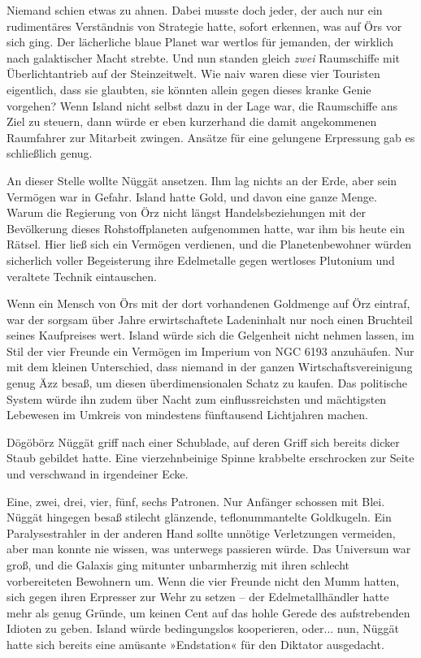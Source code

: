 Niemand schien etwas zu ahnen. Dabei musste doch jeder, der auch nur ein rudimentäres Verständnis von Strategie hatte, sofort erkennen, was auf Örs vor sich ging. Der lächerliche blaue Planet war wertlos für jemanden, der wirklich nach galaktischer Macht strebte. Und nun standen gleich \emph{zwei} Raumschiffe mit Überlichtantrieb auf der Steinzeitwelt. Wie naiv waren diese vier Touristen eigentlich, dass sie glaubten, sie könnten allein gegen dieses kranke Genie vorgehen? Wenn Island nicht selbst dazu in der Lage war, die Raumschiffe ans Ziel zu steuern, dann würde er eben kurzerhand die damit angekommenen Raumfahrer zur Mitarbeit zwingen. Ansätze für eine gelungene Erpressung gab es schließlich genug.

An dieser Stelle wollte Nüggät ansetzen. Ihm lag nichts an der Erde, aber sein Vermögen war in Gefahr. Island hatte Gold, und davon eine ganze Menge. Warum die Regierung von Örz nicht längst Handelsbeziehungen mit der Bevölkerung dieses Rohstoffplaneten aufgenommen hatte, war ihm bis heute ein Rätsel. Hier ließ sich ein Vermögen verdienen, und die Planetenbewohner würden sicherlich voller Begeisterung ihre Edelmetalle gegen wertloses Plutonium und veraltete Technik eintauschen.

Wenn ein Mensch von Örs mit der dort vorhandenen Goldmenge auf Örz eintraf, war der sorgsam über Jahre erwirtschaftete Ladeninhalt nur noch einen Bruchteil seines Kaufpreises wert. Island würde sich die Gelgenheit nicht nehmen lassen, im Stil der vier Freunde ein Vermögen im Imperium von NGC 6193 anzuhäufen. Nur mit dem kleinen Unterschied, dass niemand in der ganzen Wirtschaftsvereinigung genug Äzz besaß, um diesen überdimensionalen Schatz zu kaufen. Das politische System würde ihn zudem über Nacht zum einflussreichsten und mächtigsten Lebewesen im Umkreis von mindestens fünftausend Lichtjahren machen.

Dögöbörz Nüggät griff nach einer Schublade, auf deren Griff sich bereits dicker Staub gebildet hatte. Eine vierzehnbeinige Spinne krabbelte erschrocken zur Seite und verschwand in irgendeiner Ecke.

Eine, zwei, drei, vier, fünf, sechs Patronen. Nur Anfänger schossen mit Blei. Nüggät hingegen besaß stilecht glänzende, teflonummantelte Goldkugeln. Ein Paralysestrahler in der anderen Hand sollte unnötige Verletzungen vermeiden, aber man konnte nie wissen, was unterwegs passieren würde. Das Universum war groß, und die Galaxis ging mitunter unbarmherzig mit ihren schlecht vorbereiteten Bewohnern um. Wenn die vier Freunde nicht den Mumm hatten, sich gegen ihren Erpresser zur Wehr zu setzen – der Edelmetallhändler hatte mehr als genug Gründe, um keinen Cent auf das hohle Gerede des aufstrebenden Idioten zu geben. Island würde bedingungslos kooperieren, oder... nun, Nüggät hatte sich bereits eine amüsante »Endstation« für den Diktator ausgedacht.

